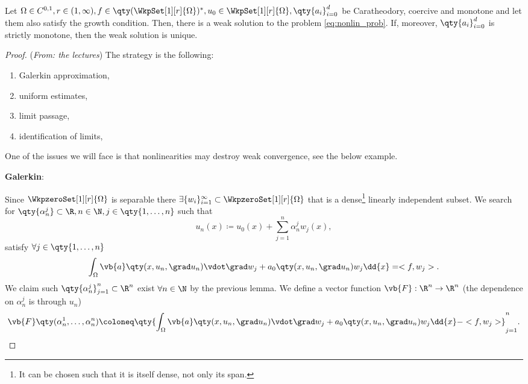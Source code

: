 \begin{theorem}
	Let $\Omega \in C^{0,1}, r \in (1,\infty),f \in \qty(\WkpSet[1][r]{\Omega})^{*}, u_0 \in \WkpSet[1][r]{\Omega},  \qty{a_i}_{i=0}^d$ be Caratheodory, coercive and monotone and let them also satisfy the growth condition. Then, there is a weak solution to the problem \ref{eq:nonlin_prob}.
	If, moreover, $\qty{a_i}_{i=0}^d$ is strictly monotone, then the weak solution is unique.
\end{theorem}

\begin{proof}(\textit{From: the lectures})
	The strategy is the following:
	\begin{enumerate}
		\item Galerkin approximation,
		\item uniform estimates,
		\item limit passage,
		\item identification of limits,
	\end{enumerate}
	One of the issues we will face is that nonlinearities may destroy weak convergence, see the below example. 

	\textbf{Galerkin}: 

	Since $\WkpzeroSet[1][r]{\Omega}$ is separable there $\exists \{w_i\}_{i=1}^{\infty} \subset \WkpzeroSet[1][r]{\Omega}$ that is a dense\footnote{It can be chosen such that it is itself dense, not only its span.} linearly independent subset. We search for $\qty{\alpha_n^j} \subset \R, n \in \N, j \in \qty{1, \dots, n}$ such that
	\[
		u_n(x) \coloneq u_0(x) + \sum_{j=1}^n \alpha^j_n w_j(x),
	\]
	satisfy $\forall j \in \qty{1, \dots, n}$
	\[
		\int_{\Omega}\vb{a}\qty(x, u_n, \grad u_n) \vdot \grad w_j + a_0\qty(x,u_n,\grad u_n)w_j\dd{x} = <f,w_j>.
	\]
	We claim such $\qty{\alpha^j_n}_{j=1}^n \subset \R^n$ exist $\forall n \in \N$ by the previous lemma. We define a vector function $\vb{F}: \R^{n} \to \R^{n}$  (the dependence on $\alpha_n^j$ is through $u_n$)
	\[
		\vb{F}\qty(\alpha^1_n, \dots, \alpha^n_n)\coloneq \qty{ \int_{\Omega}\vb{a}\qty(x, u_n, \grad u_n) \vdot \grad w_j + a_0\qty(x, u_n, \grad u_n) w_j \dd{x} - <f,w_j>}_{j=1}^n.
	\]


\end{proof}
